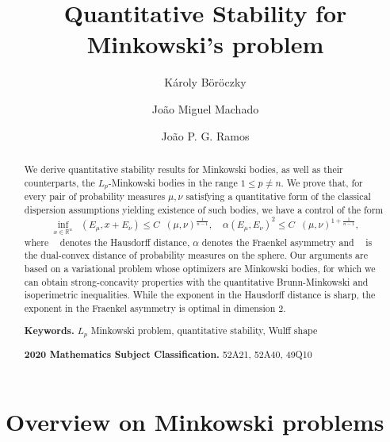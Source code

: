 \documentclass[a4paper, 10pt, twoside]{amsart}
\title[Quantitative Stability for Minkowski's problem]{Quantitative Stability for Minkowski's problem}
\author{Károly Böröczky}
\author{João Miguel Machado}
\author{João P. G. Ramos}
\numberwithin{equation}{section}
\theoremstyle{plain}
\theoremstyle{definition}
\DeclareMathOperator{\dc}{\mathrm{d}_\mathrm{C}}
\DeclareMathOperator{\dH}{\mathrm{d}_\mathrm{H}}
\begin{document}
\begin{abstract}
We derive quantitative stability results for Minkowski bodies, as well as their counterparts, the $L_p$-Minkowski bodies in the range $1 \le p \neq n$. We prove that, for every pair of probability measures $\mu,\nu$ satisfying a quantitative form of the classical dispersion assumptions yielding existence of such bodies, we have a control of the form 
\[
    \inf_{x\in \mathbb{R}^n}\dH(E_\mu, x + E_\nu) \le C \dc(\mu,\nu)^{\frac{1}{n-1}}, \quad 
    \alpha(E_\mu, E_\nu)^2 \le C \dc(\mu,\nu)^{1 + \frac{1}{n-1}},
\]
where $\dH$ denotes the Hausdorff distance, $\alpha$ denotes the Fraenkel asymmetry and $\dc$ is the dual-convex distance of probability measures on the sphere. Our arguments are based on a variational problem whose optimizers are Minkowski bodies, for which we can obtain strong-concavity properties with the quantitative Brunn-Minkowski and isoperimetric inequalities. While the exponent in the Hausdorff distance is sharp, the exponent in the Fraenkel asymmetry is optimal in dimension $2$. 
\bigskip

\noindent\textbf{Keywords.} $L_p$ Minkowski problem, quantitative stability, Wulff shape

\medskip

\noindent\textbf{2020 Mathematics Subject Classification.} 52A21, 52A40, 49Q10

\end{abstract}

\maketitle
\tableofcontents

\section{Overview on Minkowski problems}\label{sec.introduction}
\end{document}
